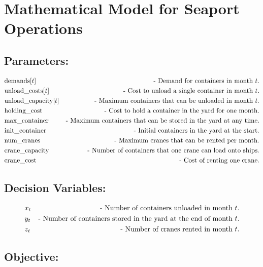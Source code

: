\documentclass{article}
\begin{document}
\section*{Mathematical Model for Seaport Operations}

\subsection*{Parameters:}

\begin{align*}
& \text{demands}[t] & \text{- Demand for containers in month $ t $.} \\
& \text{unload\_costs}[t] & \text{- Cost to unload a single container in month $ t $.} \\
& \text{unload\_capacity}[t] & \text{- Maximum containers that can be unloaded in month $ t $.} \\
& \text{holding\_cost} & \text{- Cost to hold a container in the yard for one month.} \\
& \text{max\_container} & \text{- Maximum containers that can be stored in the yard at any time.} \\
& \text{init\_container} & \text{- Initial containers in the yard at the start.} \\
& \text{num\_cranes} & \text{- Maximum cranes that can be rented per month.} \\
& \text{crane\_capacity} & \text{- Number of containers that one crane can load onto ships.} \\
& \text{crane\_cost} & \text{- Cost of renting one crane.}
\end{align*}

\subsection*{Decision Variables:}

\begin{align*}
& x_t & \text{- Number of containers unloaded in month $ t $.} \\
& y_t & \text{- Number of containers stored in the yard at the end of month $ t $.} \\
& z_t & \text{- Number of cranes rented in month $ t $.}
\end{align*}

\subsection*{Objective:}
\end{document}
